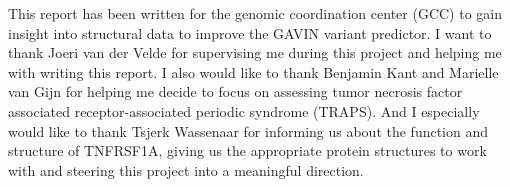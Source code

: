 This report has been written for the genomic coordination center (GCC) to gain insight into structural data to improve the GAVIN variant predictor. I want to thank Joeri van der Velde for supervising me during this project and helping me with writing this report. I also would like to thank Benjamin Kant and Marielle van Gijn for helping me decide to focus on assessing tumor necrosis factor associated receptor-associated periodic syndrome (TRAPS). And I especially would like to thank Tsjerk Wassenaar for informing us about the function and structure of TNFRSF1A, giving us the appropriate protein structures to work with and steering this project into a meaningful direction.